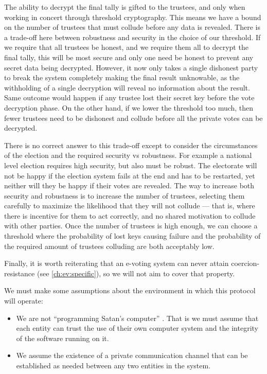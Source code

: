 The ability to decrypt the final tally is gifted to the trustees, and only when working in concert through threshold cryptography. This means we have a bound on the number of trustees that must collude before any data is revealed. There is a trade-off here between robustness and security in the choice of our threshold. If we require that all trustees be honest, and we require them all to decrypt the final tally, this will be most secure and only one need be honest to prevent any secret data being decrypted. However, it now only takes a single dishonest party to break the system completely making the final result unknowable, as the withholding of a single decryption will reveal no information about the result. Same outcome would happen if any trustee lost their secret key before the vote decryption phase. On the other hand, if we lower the threshold too much, then fewer trustees need to be dishonest and collude before all the private votes can be decrypted.

There is no correct answer to this trade-off except to consider the circumstances of the election and the required security vs robustness. For example a national level election requires high security, but also must be robust. The electorate will not be happy if the election system fails at the end and has to be restarted, yet neither will they be happy if their votes are revealed. The way to increase both security and robustness is to increase the number of trustees, selecting them carefully to maximize the likelihood that they will not collude --- that is, where there is incentive for them to act correctly, and no shared motivation to collude with other parties. Once the number of trustees is high enough, we can choose a threshold where the probability of lost keys causing failure and the probability of the required amount of trustees colluding are both acceptably low.

Finally, it is worth reiterating that an e-voting system can never attain coercion-resistance (see \autoref{ch:ev:specific}), so we will not aim to cover that property.

We must make some assumptions about the environment in which this protocol will operate:

\begin{itemize}
    \item We are not ``programming Satan's computer'' \cite{andersonProgrammingSatanComputer1995}. That is we must assume that each entity can trust the use of their own computer system and the integrity of the software running on it.
    \item We assume the existence of a private communication channel that can be established as needed between any two entities in the system.
\end{itemize}

